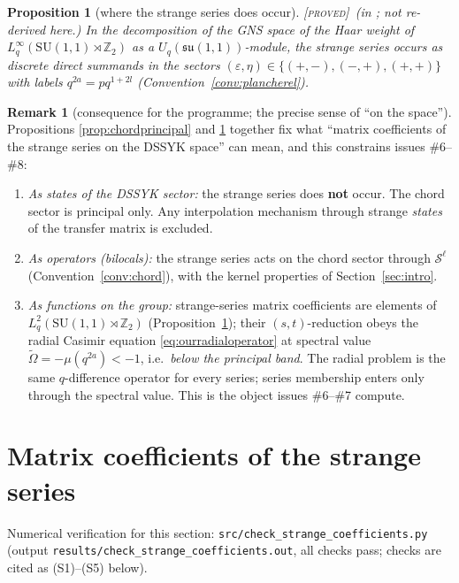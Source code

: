 \documentclass[11pt,a4paper]{article}
\newcommand{\PROVED}{{\color{ForestGreen}\textsc{[proved]}}}
\theoremstyle{definition}
\newtheorem{remark}[definition]{Remark}
\theoremstyle{plain}
\newtheorem{proposition}[definition]{Proposition}
\newcommand{\Uq}{U_q(\mathfrak{su}(1,1))}
\newcommand{\tCas}{\tilde\Omega}                %
\newcommand{\Z}{\mathbb{Z}}
\begin{document}
\begin{proposition}[where the strange series does occur]\label{prop:strangewhere}
\PROVED\ (in \cite{Groenevelt:2009gkk}; not re-derived here.) In the decomposition of the GNS
space of the Haar weight of $L^{\infty}_{q}(\mathrm{SU}(1,1)\rtimes\Z_2)$ as a $\Uq$-module, the
strange series occurs as discrete direct summands in the sectors $(\varepsilon,\eta)\in
\{(+,-),(-,+),(+,+)\}$ with labels $q^{2a}=pq^{1+2l}$ (Convention~\ref{conv:plancherel}).
\end{proposition}

\begin{remark}[consequence for the programme; the precise sense of ``on the space'']
\label{rem:strangeonspace}
Propositions \ref{prop:chordprincipal} and \ref{prop:strangewhere} together fix what ``matrix
coefficients of the strange series on the DSSYK space'' can mean, and this constrains issues
\#6--\#8:
\begin{enumerate}[label=(\roman*)]
\item \emph{As states of the DSSYK sector:} the strange series does \textbf{not} occur. The
chord sector is principal only. Any interpolation mechanism through strange \emph{states} of the
transfer matrix is excluded.
\item \emph{As operators (bilocals):} the strange series acts on the chord sector through
$\mathcal{S}^{\ell}$ (Convention~\ref{conv:chord}), with the kernel properties of
Section~\ref{sec:intro}.
\item \emph{As functions on the group:} strange-series matrix coefficients are elements of
$L^{2}_{q}(\mathrm{SU}(1,1)\rtimes\Z_2)$ (Proposition~\ref{prop:strangewhere}); their
$(s,t)$-reduction obeys the radial Casimir equation \eqref{eq:ourradialoperator} at spectral
value $\tCas=-\mu(q^{2a})<-1$, i.e.\ \emph{below the principal band}. The radial problem is the
same $q$-difference operator for every series; series membership enters only through the
spectral value. This is the object issues \#6--\#7 compute.
\end{enumerate}
\end{remark}

\section{Matrix coefficients of the strange series}
\label{sec:matrixcoeffs}


Numerical verification for this section: \texttt{src/check\_strange\_coefficients.py}
(output \texttt{results/check\_strange\_coefficients.out}, all checks pass; checks are cited
as (S1)--(S5) below).
\end{document}
